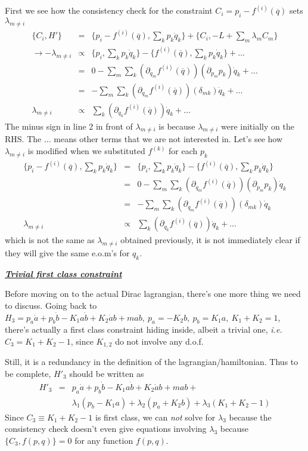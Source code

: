 \documentclass[aps,preprint,preprintnumbers,nofootinbib,showpacs,prd]{revtex4-1}
\newcommand{\ie}{{\it i.e.} }
\newcommand{\nbea}{\begin{eqnarray*}}
\newcommand{\neea}{\end{eqnarray*}}
\begin{document}
First we see how the consistency check for the constraint $C_i = p_i - f^{(i)}(\overline q)$ sets $\lambda_{m\neq i}$ 
%
\nbea
\{C_i, H'\} & = & \{p_i - f^{(i)}(\overline q), \sum_k p_k \dot q_k\} + \{C_i, -L + \sum_m \lambda_m C_m\}\\
\to -\lambda_{m\neq i} & \propto & \{p_i, \sum_k p_k \dot q_k\} - \{f^{(i)}(\overline q), \sum_k p_k \dot q_k\} + ... \\
& = & 0 - \sum_m\sum_k (\partial_{q_m} f^{(i)}(\overline q)) (\partial_{p_m} p_k) \dot q_k  + ... \\
& = &  - \sum_m\sum_k (\partial_{q_m} f^{(i)}(\overline q)) (\delta_{mk}) \dot q_k  + ... \\
\lambda_{m\neq i} & \propto & \sum_k (\partial_{q_k} f^{(i)}(\overline q)) \dot q_k  + ...
\neea
%
The minus sign in line 2 in front of $\lambda_{m\neq i}$ is because $\lambda_{m\neq i}$ were initially on the RHS. The $...$ means other terms that we are not interested in. Let's see how $\lambda_{m\neq i}$ is modified when we substituted $f^{(k)}$ for each $p_k$
%
\nbea
\{p_i - f^{(i)}(\overline q), \sum_k p_k \dot q_k\} & = & \{p_i, \sum_k p_k \dot q_k\} - \{f^{(i)}(\overline q), \sum_k p_k \dot q_k\} \\
& = & 0 - \sum_m\sum_k (\partial_{q_m} f^{(i)}(\overline q)) (\partial_{p_m} p_k) \dot q_k \\
& = &  - \sum_m\sum_k (\partial_{q_m} f^{(i)}(\overline q)) (\delta_{mk}) \dot q_k \\
\lambda_{m \neq i} & \propto & \sum_k (\partial_{q_k} f^{(i)}(\overline q)) \dot q_k + ...
\neea
%
which is not the same as $\lambda_{m \neq i}$ obtained previously, it is not immediately clear if they will give the same e.o.m's for $q_k$.

\bigskip
\underline{\textbf{\textit{Trivial first class constraint}}}

Before moving on to the actual Dirac lagrangian, there's one more thing we need to discuss. Going back to $H_3 = p_a \dot a + p_b \dot b - K_1 a \dot b + K_2\dot a b + mab, ~p_a = -K_2 b, ~p_b = K_1 a,~ K_1 + K_2 = 1$, there's actually a first class constraint hiding inside, albeit a trivial one, \ie $C_3 = K_1 + K_2 - 1$, since $K_{1,2}$ do not involve any d.o.f.

Still, it is a redundancy in the definition of the lagrangian/hamiltonian. Thus to be complete, $H'_3$ should be written as
%
\nbea
H'_3 & = & p_a \dot a + p_b \dot b - K_1 a \dot b + K_2\dot a b + mab + \\
&& \lambda_1(p_b - K_1 a) + \lambda_2 (p_a  + K_2 b) + \lambda_3(K_1 + K_2 - 1)
\neea
%
Since $C_3 \equiv K_1 + K_2 - 1$ is first class, we can {\it not} solve for $\lambda_3$ because the consistency check doesn't even give equations involving $\lambda_3$ because $\{C_3, f(p,q)\} = 0$ for any function $f(p,q)$.
\end{document}
